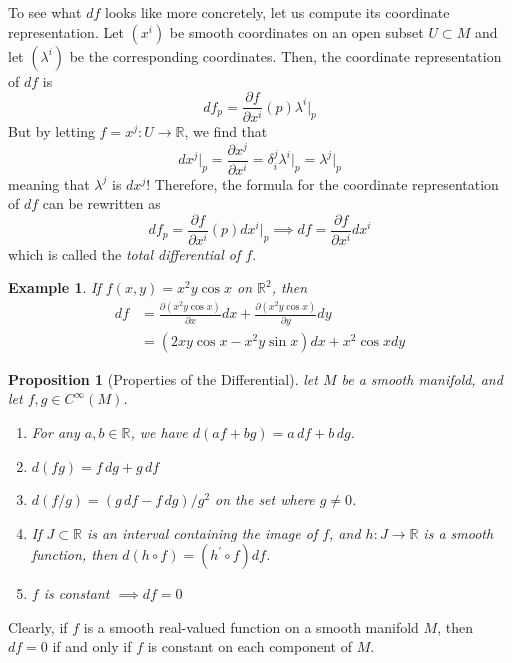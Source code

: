 \documentclass{article}
\newtheorem{proposition}[theorem]{Proposition}
\newtheorem{example}{Example}[section]
\theoremstyle{remark}
\theoremstyle{definition}
\begin{document}
To see what $df$ looks like more concretely, let us compute its coordinate representation. Let $(x^i)$ be smooth coordinates on an open subset $U \subset M$ and let $(\lambda^i)$ be the corresponding coordinates. Then, the coordinate representation of $df$ is
\[df_p = \frac{\partial f}{\partial x^i} (p) \lambda^i \big|_p\]
But by letting $f = x^j: U \longrightarrow \mathbb{R}$, we find that
\[d x^j \big|_p = \frac{\partial x^j}{\partial x^i} = \delta_i^j \lambda^i \big|_p = \lambda^j \big|_p\]
meaning that $\lambda^j$ is $dx^j$! Therefore, the formula for the coordinate representation of $df$ can be rewritten as
\[df_p = \frac{\partial f}{\partial x^i} (p) dx^i \big|_p \implies df = \frac{\partial f}{\partial x^i} dx^i\]
which is called the \textit{total differential of $f$}. 

\begin{example}
If $f(x, y) = x^2 y \cos{x}$ on $\mathbb{R}^2$, then 
\begin{align*}
df & = \frac{\partial( x^2 y \cos{x})}{\partial x} dx + \frac{\partial (x^2 y \cos{x})}{\partial y} dy \\
& = (2xy \cos{x} - x^2 y \sin{x}) dx + x^2 \cos{x} dy
\end{align*}
\end{example}

\begin{proposition}[Properties of the Differential]
let $M$ be a smooth manifold, and let $f, g \in C^\infty (M)$. 
\begin{enumerate}
    \item For any $a, b \in \mathbb{R}$, we have $d(a f + b g) = a\,df + b\,dg$. 
    \item $d(fg) = f\,dg + g\,df$
    \item $d(f/g) = (g\,df - f\,dg)/g^2$ on the set where $g \neq 0$. 
    \item If $J \subset \mathbb{R}$ is an interval containing the image of $f$, and $h: J \longrightarrow \mathbb{R}$ is a smooth function, then $d(h \circ f) = (h^\prime \circ f) df$. 
    \item $f$ is constant $\implies df = 0$
\end{enumerate}
\end{proposition}
Clearly, if $f$ is a smooth real-valued function on a smooth manifold $M$, then $df = 0$ if and only if $f$ is constant on each component of $M$. 
\end{document}
